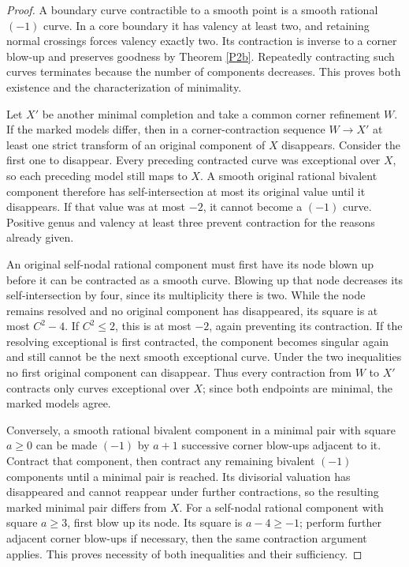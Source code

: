 \begin{proof}
A boundary curve contractible to a smooth point is a smooth
rational $(-1)$ curve. In a core boundary it has valency at least
two, and retaining normal crossings forces valency exactly two.
Its contraction is inverse to a corner blow-up and preserves
goodness by Theorem \ref{P2b}. Repeatedly contracting such curves
terminates because the number of components decreases. This
proves both existence and the characterization of minimality.

Let $X'$ be another minimal completion and take a common corner
refinement $W$. If the marked models differ, then in a
corner-contraction sequence $W\to X'$ at least one strict
transform of an original component of $X$ disappears. Consider
the first one to disappear. Every preceding contracted curve
was exceptional over $X$, so each preceding model still maps
to $X$. A smooth original rational bivalent component therefore
has self-intersection at most its original value until it
disappears. If that value was at most $-2$, it cannot become a
$(-1)$ curve. Positive genus and valency at least three prevent
contraction for the reasons already given.

An original self-nodal rational component must first have its
node blown up before it can be contracted as a smooth curve.
Blowing up that node decreases its self-intersection by four,
since its multiplicity there is two. While the node remains
resolved and no original component has disappeared, its square
is at most $C^2-4$. If $C^2\leq2$, this is at most $-2$, again
preventing its contraction. If the resolving exceptional is
first contracted, the component becomes singular again and
still cannot be the next smooth exceptional curve. Under the
two inequalities no first original component can disappear.
Thus every contraction from $W$ to $X'$ contracts only curves
exceptional over $X$; since both endpoints are minimal, the
marked models agree.

Conversely, a smooth rational bivalent component in a minimal
pair with square $a\geq0$ can be made $(-1)$ by $a+1$ successive
corner blow-ups adjacent to it. Contract that component, then
contract any remaining bivalent $(-1)$ components until a
minimal pair is reached. Its divisorial valuation has
disappeared and cannot reappear under further contractions,
so the resulting marked minimal pair differs from $X$.
For a self-nodal rational component with square $a\geq3$,
first blow up its node. Its square is $a-4\geq-1$; perform
further adjacent corner blow-ups if necessary, then the same
contraction argument applies. This proves necessity of both
inequalities and their sufficiency.
\end{proof}

